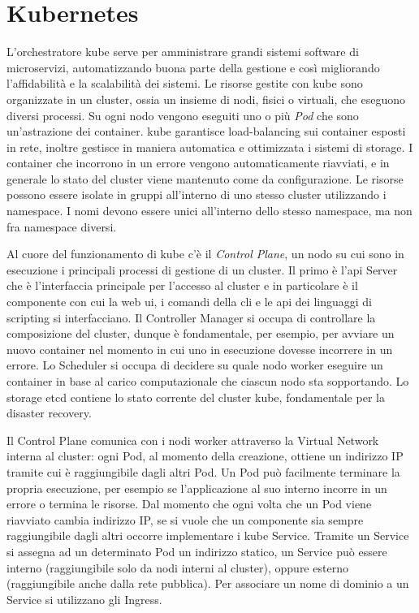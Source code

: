 \documentclass[12pt,a4paper,fleqn,titlepage]{report}
\begin{document}
    \section{Kubernetes}\label{sec:kubernetes}
        L'orchestratore \gls{kube} serve per amministrare grandi sistemi software di microservizi, automatizzando buona parte della gestione e così migliorando l'affidabilità e la scalabilità dei sistemi. Le risorse gestite con \gls{kube} sono organizzate in un \gls{cluster}, ossia un insieme di nodi, fisici o virtuali, che eseguono diversi processi. Su ogni nodo vengono eseguiti uno o più \emph{Pod} che sono un'astrazione dei \gls{container}.
        \gls{kube} garantisce load-balancing sui \gls{container} esposti in rete, inoltre gestisce in maniera automatica e ottimizzata i sistemi di storage. I \gls{container} che incorrono in un errore vengono automaticamente riavviati, e in generale lo stato del \gls{cluster} viene mantenuto come da configurazione. Le risorse possono essere isolate in gruppi all'interno di uno stesso \gls{cluster} utilizzando i namespace. I nomi devono essere unici all'interno dello stesso namespace, ma non fra namespace diversi.

        Al cuore del funzionamento di \gls{kube} c'è il \emph{Control Plane}, un nodo su cui sono in esecuzione i principali processi di gestione di un \gls{cluster}. Il primo è l'\gls{api} Server che è l'interfaccia principale per l'accesso al \gls{cluster} e in particolare è il componente con cui la web \gls{ui}, i comandi della \gls{cli} e le \gls{api} dei linguaggi di scripting si interfacciano. Il Controller Manager si occupa di controllare la composizione del \gls{cluster}, dunque è fondamentale, per esempio, per avviare un nuovo \gls{container} nel momento in cui uno in esecuzione dovesse incorrere in un errore. Lo Scheduler si occupa di decidere su quale nodo worker eseguire un \gls{container} in base al carico computazionale che ciascun nodo sta sopportando. Lo storage etcd contiene lo stato corrente del \gls{cluster} \gls{kube}, fondamentale per la disaster recovery.

        Il Control Plane comunica con i nodi worker attraverso la Virtual Network interna al \gls{cluster}: ogni Pod, al momento della creazione, ottiene un indirizzo IP tramite cui è raggiungibile dagli altri Pod.
        Un Pod può facilmente terminare la propria esecuzione, per esempio se l'applicazione al suo interno incorre in un errore o termina le risorse. Dal momento che ogni volta che un Pod viene riavviato cambia indirizzo IP, se si vuole che un componente sia sempre raggiungibile dagli altri occorre implementare i \gls{kube} Service. Tramite un Service si assegna ad un determinato Pod un indirizzo statico, un Service può essere interno (raggiungibile solo da nodi interni al \gls{cluster}), oppure esterno (raggiungibile anche dalla rete pubblica). Per associare un nome di dominio a un Service si utilizzano gli Ingress.
\end{document}
